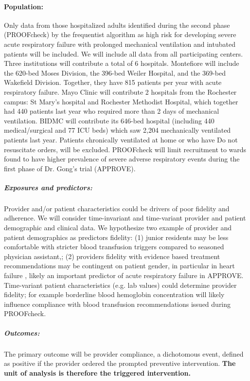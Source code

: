 \documentclass[11pt,notitlepage]{article}
\begin{document}
\paragraph*{Population:} 
Only data from those hospitalized adults identified during the second phase (PROOFcheck) by the frequentist algorithm as high risk for developing severe acute respiratory failure with prolonged mechanical ventilation and intubated patients will be included. We will include all data from all participating centers. Three institutions will contribute a total of 6 hospitals. Montefiore will include the 620-bed Moses Division, the 396-bed Weiler Hospital, and the 369-bed Wakefield Division. Together, they have 815 patients per year with acute respiratory failure.  Mayo Clinic will contribute 2 hospitals from the Rochester campus: St Mary’s hospital and Rochester Methodist Hospital, which together had 440 patients last year who required more than 2 days of mechanical ventilation.  BIDMC will contribute its 646-bed hospital (including 440 medical/surgical and 77 ICU beds) which saw 2,204 mechanically ventilated patients last year. Patients chronically ventilated at home or who have Do not resuscitate orders, will be excluded. PROOFcheck will limit recruitment to wards found to have higher prevalence of severe adverse respiratory events during the first phase of Dr. Gong's trial (APPROVE). 

\subparagraph*{Exposures and predictors:}
Provider and/or patient characteristics could be drivers of poor fidelity and adherence. We will consider time-invariant and time-variant provider and patient demographic and clinical data. We hypothesize two example of provider and patient demographics as predictors fidelity: (1) junior residents may be less comfortable with stricter blood transfusion triggers compared to seasoned physician assistant,; (2) providers fidelity with evidence based treatment recommendations may be contingent on patient gender, in particular in heart failure \cite{Cook_25714825}, likely an important predictor of acute respiratory failure in APPROVE. Time-variant patient characteristics (e.g. lab values) could determine provider fidelity; for example borderline blood hemoglobin concentration will likely influence compliance with blood transfusion recommendations issued during PROOFcheck. 

\subparagraph*{Outcomes:}
The primary outcome will be provider compliance, a dichotomous event, defined as positive if the provider ordered the prompted preventive intervention. \textbf{ The unit of analysis is therefore the triggered intervention.}
\end{document}
